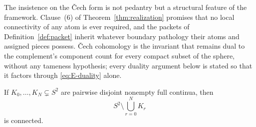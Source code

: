 \begin{remark}\label{rem:E-cech}
The insistence on the \v{C}ech form is not pedantry but a structural feature of the
framework. Clause~(6) of Theorem~\ref{thm:realization} promises that no local
connectivity of any atom is ever required, and the packets of
Definition~\ref{def:packet} inherit whatever boundary pathology their atoms and
assigned pieces possess. \v{C}ech cohomology is the invariant that remains dual to
the complement's component count for every compact subset of the sphere, without any
tameness hypothesis; every duality argument below is stated so that it factors
through \eqref{eq:E-duality} alone.
\end{remark}

\begin{lemma}\label{lem:packets}
If $K_0,\dots,K_N\subsetneq S^2$ are pairwise disjoint nonempty full
continua, then
\[
S^2\setminus\bigcup_{r=0}^{N}K_r
\]
is connected.
\end{lemma}

